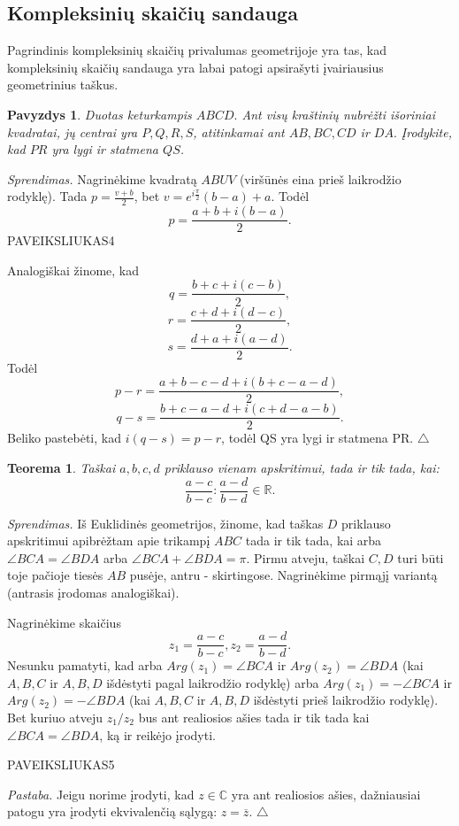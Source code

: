 \documentclass[11pt,a4paper,twoside]{book}
\newenvironment{sprendimas}{\noindent \textit{Sprendimas.}}{\hfill $\triangle$}
\newcounter{foo}[subsection]
\newtheorem{thmnr}{Teorema}
\newtheorem{pavnr}[foo]{Pavyzdys}
\theoremstyle{definition} \newtheorem*{api}{Apibrėžimas}
\theoremstyle{remark} \newtheorem*{pastaba}{Pastaba}
\begin{document}
\subsection*{Kompleksinių skaičių sandauga}
Pagrindinis kompleksinių skaičių privalumas geometrijoje yra tas, kad kompleksinių skaičių sandauga yra labai patogi apsirašyti įvairiausius geometrinius taškus. 






\begin{pavnr}
Duotas keturkampis $ABCD.$ Ant visų kraštinių nubrėžti išoriniai kvadratai, jų centrai yra $P, Q, R, S$, atitinkamai ant $AB, BC, CD$ ir $DA.$ Įrodykite, kad $PR$ yra lygi ir statmena $QS$. 
\end{pavnr}
\begin{sprendimas}
Nagrinėkime kvadratą $ABUV$ (viršūnės eina prieš laikrodžio rodyklę). Tada $p=\frac{v+b}{2}$, bet $v=e^{i\frac{\pi}{2}}(b-a)+a$. Todėl $$p=\frac{a+b+i(b-a)}{2}.$$
PAVEIKSLIUKAS4

Analogiškai žinome, kad $$q=\frac{b+c+i(c-b)}{2},$$ $$r=\frac{c+d+i(d-c)}{2},$$ $$s=\frac{d+a+i(a-d)}{2}.$$
Todėl $$p-r=\frac{a+b-c-d+i(b+c-a-d)}{2},$$ $$q-s=\frac{b+c-a-d+i(c+d-a-b)}{2}.$$
Beliko pastebėti, kad $i(q-s)=p-r$, todėl QS yra lygi ir statmena PR.
\end{sprendimas}





\begin{thmnr}
Taškai $a, b, c, d$ priklauso vienam apskritimui, tada ir tik tada, kai: 
$$\frac{a - c}{b - c}:\frac{a-d}{b-d}\in\mathbb{R}.$$
\end{thmnr}
\begin{sprendimas}
Iš Euklidinės geometrijos, žinome, kad taškas $D$ priklauso apskritimui apibrėžtam apie trikampį $ABC$ tada ir tik tada, kai arba $\angle BCA=\angle BDA$ arba $\angle BCA+\angle BDA=\pi $. Pirmu atveju, taškai $C, D$ turi būti toje pačioje tiesės $AB$ pusėje, antru - skirtingose. Nagrinėkime pirmąjį variantą (antrasis įrodomas analogiškai). 

Nagrinėkime skaičius $$z_1 =\frac{a - c}{b - c}, z_2 =\frac{a - d}{b - d}.$$ 
Nesunku pamatyti, kad arba $Arg (z_1) = \angle BCA$ ir $Arg (z_2) = \angle BDA$ (kai $A, B, C$ ir $A, B, D$ išdėstyti pagal laikrodžio rodyklę) arba $Arg (z_1) = -\angle BCA$ ir $Arg (z_2) =- \angle BDA$  (kai $A, B, C$ ir $A, B, D$ išdėstyti prieš laikrodžio rodyklę). Bet kuriuo atveju $z_1/z_2$ bus ant realiosios ašies tada ir tik tada kai $\angle BCA=\angle BDA$, ką ir reikėjo įrodyti.

PAVEIKSLIUKAS5

\textit {Pastaba.} Jeigu norime įrodyti, kad $z \in \mathbb{C}$ yra ant realiosios ašies, dažniausiai patogu yra įrodyti ekvivalenčią sąlygą: $z=\overline{z}$.
\end{sprendimas}
\end{document}
